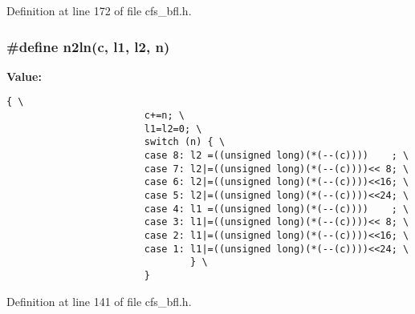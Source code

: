 Definition at line 172 of file cfs\_\-bfl.h.
\subsubsection{\setlength{\rightskip}{0pt plus 5cm}\#define n2ln({\bf c}, l1, l2, {\bf n})}\label{cfs__bfl_8h_a4}


{\bf Value:}

\footnotesize\begin{verbatim}{ \
                        c+=n; \
                        l1=l2=0; \
                        switch (n) { \
                        case 8: l2 =((unsigned long)(*(--(c))))    ; \
                        case 7: l2|=((unsigned long)(*(--(c))))<< 8; \
                        case 6: l2|=((unsigned long)(*(--(c))))<<16; \
                        case 5: l2|=((unsigned long)(*(--(c))))<<24; \
                        case 4: l1 =((unsigned long)(*(--(c))))    ; \
                        case 3: l1|=((unsigned long)(*(--(c))))<< 8; \
                        case 2: l1|=((unsigned long)(*(--(c))))<<16; \
                        case 1: l1|=((unsigned long)(*(--(c))))<<24; \
                                } \
                        }
\end{verbatim}\normalsize 


Definition at line 141 of file cfs\_\-bfl.h.